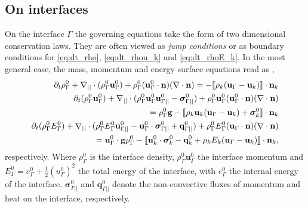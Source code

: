 \subsection{On interfaces}

On the interface $\Gamma$ the governing equations take the form of two dimensional conservation laws. 
They are often viewed as \textit{jump conditions} or as boundary conditions for  \ref{eq:dt_rho}, \ref{eq:dt_rhou_k} and \ref{eq:dt_rhoE_k}. 
In the most general case, the mass, momentum and energy surface equations read as \citep{ishii2010thermo,morel2015mathematical,bothe2022sharp}, 
\begin{align}
    \label{eq:dt_rhoI}
    \pddt \rho_\Gamma^0
    + \divI (\rho_\Gamma^0\textbf{u}_{\Gamma}^0)
    + \rho_\Gamma^0 (\textbf{u}_\Gamma^0 \cdot \textbf{n})(\div \textbf{n})
    = 
    -\Jump{
        \rho_k (\textbf{u}_\Gamma - \textbf{u}_k)
    }
    \\
    \pddt (\rho_\Gamma^0\textbf{u}_\Gamma^0)  
    + \divI (
        \rho_\Gamma^0\textbf{u}_{\Gamma}^0\textbf{u}_{\Gamma||}^0
        - \bm{\sigma}_{\Gamma||}^0)
        + \rho_\Gamma^0 \textbf{u}_\Gamma^0 (\textbf{u}_\Gamma^0 \cdot \textbf{n})(\div \textbf{n}) \nonumber\\
    = 
    \rho_\Gamma^0 \textbf{g} 
    - \Jump{
        \rho_k \textbf{u}_k (\textbf{u}_\Gamma - \textbf{u}_k)
        + \bm\sigma^0_k
    }
    \\
    \label{eq:dt_rhoIE_I}
    \pddt (\rho_\Gamma^0E_\Gamma^0)  
    + \divI (
        \rho_\Gamma^0 E_\Gamma^0\textbf{u}_{\Gamma||}^0
        - \textbf{u}_\Gamma^0 \cdot \bm{\sigma}_{\Gamma||}^0 
        + \textbf{q}_{\Gamma||}^0
        )
    + \rho_\Gamma^0E_\Gamma^0  (\textbf{u}_\Gamma \cdot \textbf{n})(\div \textbf{n})\nonumber\\
    = 
    \textbf{u}_\Gamma^0 \cdot \textbf{g}  \rho_\Gamma^0 
    - \Jump{\textbf{u}_k^0 \cdot \bm{\sigma}_k^0 - \textbf{q}_k^0
    + \rho_k E_k (\textbf{u}_\Gamma - \textbf{u}_k)
    },
\end{align} 
respectively.
Where $\rho_\Gamma^0$ is the interface density, $\rho_\Gamma^0\textbf{u}_\Gamma^0$ the interface momentum 
and $E_\Gamma^0 = e_\Gamma^0 + \frac{1}{2}(u_\Gamma^0)^2$ the total energy of the interface, with $e_\Gamma^0$ the internal energy of the interface.
$\bm{\sigma}_{\Gamma||}^0$ and $\textbf{q}_{\Gamma||}^0$ denote the non-convective fluxes of momentum and heat on the interface, respectively.


